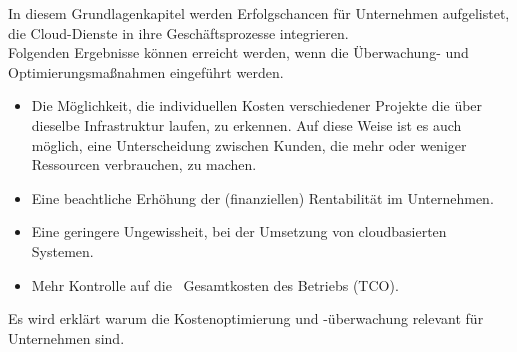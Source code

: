In diesem Grundlagenkapitel werden Erfolgschancen für Unternehmen aufgelistet, die Cloud-Dienste in ihre Geschäftsprozesse integrieren.
\\
Folgenden Ergebnisse können erreicht werden, wenn die Überwachung- und Optimierungsmaßnahmen eingeführt werden.
\begin{itemize}
      \item
            Die Möglichkeit, die individuellen Kosten verschiedener Projekte die über dieselbe Infrastruktur laufen, zu erkennen. Auf diese Weise ist es auch möglich, eine Unterscheidung zwischen Kunden, die mehr oder weniger Ressourcen verbrauchen, zu machen.
      \item
            Eine beachtliche Erhöhung der (finanziellen) Rentabilität im Unternehmen.
      \item
            Eine geringere Ungewissheit, bei der Umsetzung von cloudbasierten Systemen.
      \item
            Mehr Kontrolle auf die  Gesamtkosten des Betriebs (TCO).
            
\end{itemize}


\begin{flushleft}
      Es wird erklärt warum die Kostenoptimierung und -überwachung relevant für Unternehmen sind.
\end{flushleft}




